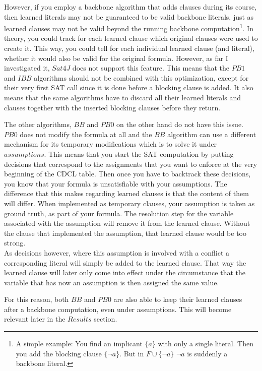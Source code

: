 However, if you employ a backbone algorithm that adds clauses during its course, then learned literals may not be guaranteed to be valid backbone literals, just as learned clauses may not be valid beyond the running backbone computation\footnote{
	A simple example: You find an implicant $\{a\}$ with only a single literal. Then you add the blocking clause $\{\neg a\}$. But in $F \cup \{\neg a\}$ $\neg a$ is suddenly a backbone literal.}.
In theory, you could track for each learned clause which original clauses were used to create it. This way, you could tell for each individual learned clause (and literal), whether it would also be valid for the original formula. However, as far I investigated it, $Sat4J$ does not support this feature. This means that the $PB1$ and $IBB$ algorithms should not be combined with this optimization, except for their very first SAT call since it is done before a blocking clause is added. It also means that the same algorithms have to discard all their learned literals and clauses together with the inserted blocking clauses before they return.

The other algorithms, $BB$ and $PB0$ on the other hand do not have this issue. $PB0$ does not modify the formula at all and the $BB$ algorithm can use a different mechanism for its temporary modifications which is to solve it under $assumptions$. This means that you start the SAT computation by putting decisions that correspond to the assignments that you want to enforce at the very beginning of the CDCL table. Then once you have to backtrack these decisions, you know that your formula is unsatisfiable with your assumptions. The difference that this makes regarding learned clauses is that the content of them will differ. When implemented as temporary clauses, your assumption is taken as ground truth, as part of your formula. The resolution step for the variable associated with the assumption will remove it from the learned clause. Without the clause that implemented the assumption, that learned clause would be too strong.\\
As decisions however, where this assumption is involved with a conflict a corresponding literal will simply be added to the learned clause. That way the learned clause will later only come into effect under the circumstance that the variable that has now an assumption is then assigned the same value.

For this reason, both $BB$ and $PB0$ are also able to keep their learned clauses after a backbone computation, even under assumptions. This will become relevant later in the $Results$ section.


